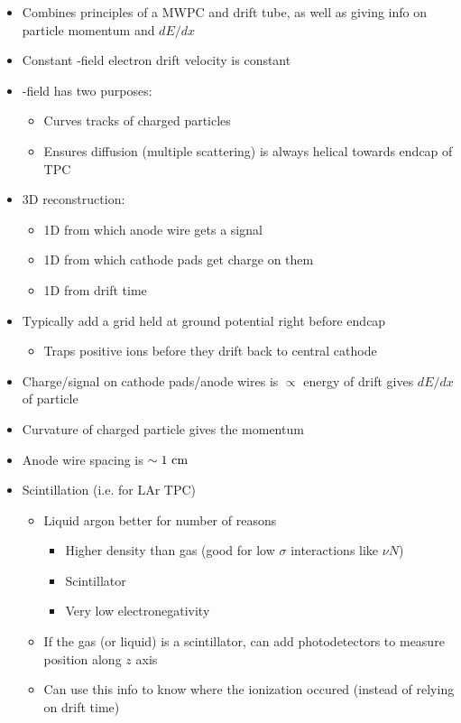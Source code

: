 \begin{itemize}
  \item Combines principles of a MWPC and drift tube, as well as giving info on particle momentum and $dE/dx$
  \item Constant \E-field \thus electron drift velocity is constant
  \item \B-field has two purposes:
  \begin{itemize}
    \item Curves tracks of charged particles
    \item Ensures \el diffusion (multiple scattering) is always helical towards endcap of TPC
  \end{itemize}
  \item 3D reconstruction:
  \begin{itemize}
    \item 1D from which anode wire gets a signal
    \item 1D from which cathode pads get charge on them
    \item 1D from drift time
  \end{itemize}
  \item Typically add a grid held at ground potential right before endcap
  \begin{itemize}
    \item Traps positive ions before they drift back to central cathode
  \end{itemize}
  \item Charge/signal on cathode pads/anode wires is $\propto$ energy of drift \el \thus gives $dE/dx$ of particle
  \item Curvature of charged particle gives the momentum
  \item Anode wire spacing is $\sim1~\text{cm}$
  \item Scintillation (i.e. for LAr TPC)
  \begin{itemize}
    \item Liquid argon better for number of reasons
    \begin{itemize}
      \item Higher density than gas (good for low $\sigma$ interactions like $\nu N$)
      \item Scintillator
      \item Very low electronegativity
    \end{itemize}
    \item If the gas (or liquid) is a scintillator, can add photodetectors to measure position along $z$ axis
    \item Can use this info to know where the ionization occured (instead of relying on drift time)
  \end{itemize}
\end{itemize}

